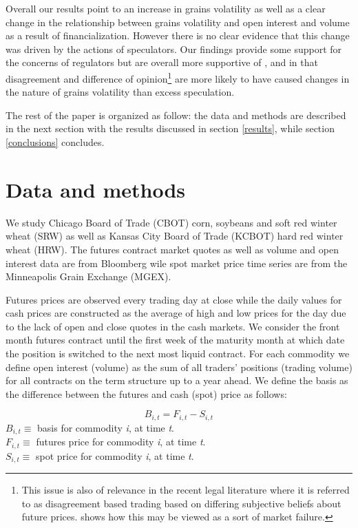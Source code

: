 \documentclass[
]{book}
\let\rmarkdownfootnote\footnote%
\def\footnote{\protect\rmarkdownfootnote}
\begin{document}
Overall our results point to an increase in grains volatility as well as a clear change in the relationship between grains volatility and open interest and volume as a result of financialization. However there is no clear evidence that this change was driven by the actions of speculators. Our findings provide some support for the concerns of regulators but are overall more supportive of \citet{goldstein_information_2015}, \citet{singleton_investor_2013} and \citet{stein_informational_1987} in that disagreement and difference of opinion\footnote{This issue is also of relevance in the recent legal literature \citep[\citet{stout_uncertainty_2011}]{stout_why_1998} where it is referred to as disagreement based trading based on differing subjective beliefs about future prices. \citet{stout_uncertainty_2011} shows how this may be viewed as a sort of market failure.} are more likely to have caused changes in the nature of grains volatility than excess speculation.

The rest of the paper is organized as follow: the data and methods are described in the next section with the results discussed in section \ref{results}, while section \ref{conclusions} concludes.

\hypertarget{data-methods}{%
\chapter{Data and methods}\label{data-methods}}

We study Chicago Board of Trade (CBOT) corn, soybeans and soft red winter wheat (SRW) as well as Kansas City Board of Trade (KCBOT) hard red winter wheat (HRW). The futures contract market quotes as well as volume and open interest data are from Bloomberg wile spot market price time series are from the Minneapolis Grain Exchange (MGEX).

Futures prices are observed every trading day at close while the daily values for cash prices are constructed as the average of high and low prices for the day due to the lack of open and close quotes in the cash markets. We consider the front month futures contract until the first week of the maturity month at which date the position is switched to the next most liquid contract. For each commodity we define open interest (volume) as the sum of all traders' positions (trading volume) for all contracts on the term structure up to a year ahead. We define the basis as the difference between the futures and cash (spot) price as follows:

\[B_{i, t}=F_{i, t}-S_{i, t}\]
\(B_{i, t}\equiv\) basis for commodity \textit{i}, at time \textit{t}.\\
\(F_{i, t}\equiv\) futures price for commodity \textit{i}, at time \textit{t}.\\
\(S_{i, t}\equiv\) spot price for commodity \textit{i}, at time \textit{t}.
\end{document}
